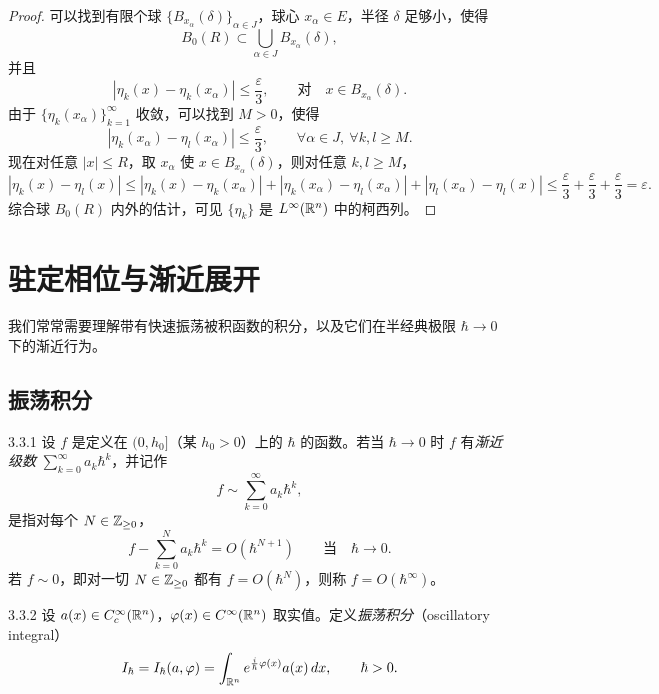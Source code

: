 \begin{proof}
可以找到有限个球 $\{B_{x_\alpha}(\delta)\}_{\alpha\in J}$，球心 $x_\alpha\in E$，半径 $\delta$ 足够小，使得
\[
B_0(R)\subset\bigcup_{\alpha\in J}B_{x_\alpha}(\delta),
\]
并且
\[
|\eta_k(x)-\eta_k(x_\alpha)|\le\frac{\varepsilon}{3},\qquad\text{对}\quad x\in B_{x_\alpha}(\delta).
\]
由于 $\{\eta_k(x_\alpha)\}_{k=1}^\infty$ 收敛，可以找到 $M>0$，使得
\[
|\eta_k(x_\alpha)-\eta_l(x_\alpha)|\le\frac{\varepsilon}{3},\qquad\forall\alpha\in J,\ \forall k,l\ge M.
\]
现在对任意 $|x|\le R$，取 $x_\alpha$ 使 $x\in B_{x_\alpha}(\delta)$，则对任意 $k,l\ge M$，
\[
|\eta_k(x)-\eta_l(x)|\le|\eta_k(x)-\eta_k(x_\alpha)|+|\eta_k(x_\alpha)-\eta_l(x_\alpha)|+|\eta_l(x_\alpha)-\eta_l(x)|\le\frac{\varepsilon}{3}+\frac{\varepsilon}{3}+\frac{\varepsilon}{3}=\varepsilon.
\]
综合球 $B_0(R)$ 内外的估计，可见 $\{\eta_k\}$ 是 $L^\infty(\mathbb{R}^n)$ 中的柯西列。
\end{proof}


\section{驻定相位与渐近展开}

我们常常需要理解带有快速振荡被积函数的积分，以及它们在半经典极限 $\hbar\to0$ 下的渐近行为。

\subsection{振荡积分}

\begin{definition}{3.3.1}
设 $f$ 是定义在 $(0,h_0]$（某 $h_0>0$）上的 $\hbar$ 的函数。若当 $\hbar\to0$ 时 $f$ 有\emph{渐近级数} $\sum_{k=0}^\infty a_k\hbar^k$，并记作
\[
f\sim\sum_{k=0}^\infty a_k\hbar^k,
\]
是指对每个 $N\in\mathbb{Z}_{\ge0}$，
\[
f-\sum_{k=0}^N a_k\hbar^k=O(\hbar^{N+1})\qquad\text{当}\quad\hbar\to0.
\]
若 $f\sim0$，即对一切 $N\in\mathbb{Z}_{\ge0}$ 都有 $f=O(\hbar^N)$，则称 $f=O(\hbar^\infty)$。
\end{definition}

\begin{definition}{3.3.2}
设 $a(x)\in C_c^\infty(\mathbb{R}^n)$，$\varphi(x)\in C^\infty(\mathbb{R}^n)$ 取实值。定义\emph{振荡积分}（oscillatory integral）
\[
I_\hbar=I_\hbar(a,\varphi)=\int_{\mathbb{R}^n}e^{\frac i\hbar\varphi(x)}a(x)\,dx,\qquad\hbar>0.
\]
\end{definition}

